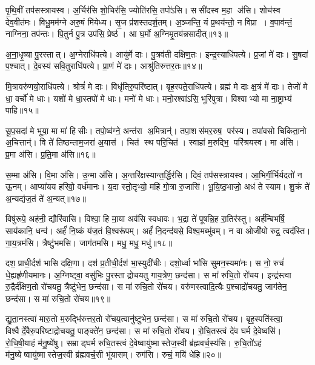 पृ॒थि॒वीं तप॑सस्त्रायस्व। अ॒र्चिर॑सि शो॒चिर॑सि॒ ज्योति॑रसि॒ तपो॑ऽसि। ससी॑दस्व म॒हा अ॑सि। शोच॑स्व देव॒वीत॑मः। विधू॒मम॑ग्ने अरु॒षं मि॑येध्य। सृ॒ज प्र॑शस्तदर्\mbox{}श॒तम्। अ॒ञ्जन्ति॒ यं प्र॒थय॑न्तो॒ न विप्रा। व॒पाव॑न्तं॒ नाग्निना॒ तप॑न्तः। पि॒तुर्न पु॒त्र उप॑सि॒ प्रेष्ठ॑। आ घ॒र्मो अ॒ग्निमृ॒तय॑न्नसादीत्॥१३॥

अ॒ना॒धृ॒ष्या पु॒रस्तात्। अ॒ग्नेराधि॑पत्ये। आयु॑र्मे दाः। पु॒त्रव॑ती दक्षिण॒तः। इन्द्र॒स्याधि॑पत्ये। प्र॒जां मे॑ दाः। सु॒षदा॑ प॒श्चात्। दे॒वस्य॑ सवि॒तुराधि॑पत्ये। प्रा॒णं मे॑ दाः। आश्रु॑तिरुत्तर॒तः॥१४॥

मि॒त्रावरु॑णयो॒राधि॑पत्ये। श्रोत्रं॑ मे दाः। विधृ॑तिरु॒परि॑ष्टात्। बृह॒स्पते॒राधि॑पत्ये। ब्रह्म॑ मे दाः क्ष॒त्रं मे॑ दाः। तेजो॑ मे धा॒ वर्चो॑ मे धाः। यशो॑ मे धा॒स्तपो॑ मे धाः। मनो॑ मे धाः। मनो॒रश्वा॑ऽसि॒ भूरि॑पुत्रा। विश्वाभ्यो मा ना॒ष्ट्राभ्य॑ पाहि॥१५॥

सू॒प॒सदा॑ मे भूया॒ मा मा॑ हिसीः। तपो॒ष्व॑ग्ने॒ अन्त॑रा अ॒मित्रान्॑। तपा॒शस॑मर॒रुष॒ पर॑स्य। तपा॑वसो चिकिता॒नो अ॒चित्तान्॑। वि ते॑ तिष्ठन्ताम॒जरा॑ अ॒यास॑। चित॑ स्थ परि॒चित॑। स्वाहा॑ म॒रुद्भि॒ परि॑श्रयस्व। मा अ॑सि। प्र॒मा अ॑सि। प्र॒ति॒मा अ॑सि॥१६॥

स॒म्मा अ॑सि। वि॒मा अ॑सि। उ॒न्मा अ॑सि। अ॒न्तरि॑क्षस्यान्त॒र्द्धि\-र॑सि। दिवं॒ तप॑सस्त्रायस्व। आ॒भिर्गी॒र्भिर्यदतो॑ न ऊ॒नम्। आप्या॑यय हरिवो॒ वर्ध॑मानः। य॒दा स्तो॒तृभ्यो॒ महि॑ गो॒त्रा रु॒जासि॑। भू॒यि॒ष्ठ॒भाजो॒ अध॑ ते स्याम। शु॒क्रं ते॑ अ॒न्यद्य॑ज॒तं ते॑ अ॒न्यत्॥१७॥

विषु॑रूपे॒ अह॑नी॒ द्यौरि॑वासि। विश्वा॒ हि मा॒या अव॑सि स्वधावः। भ॒द्रा ते॑ पूषन्नि॒ह रा॒तिर॑स्तु। अर्\mbox{}ह॑न्बिभर्\mbox{}षि॒ साय॑कानि॒ धन्व॑। अर्\mbox{}हं॑ नि॒ष्कं य॑ज॒तं  वि॒श्वरू॑पम्। अर्\mbox{}हं॑ नि॒दन्द॑यसे॒ विश्व॒मब्भु॑वम्। न वा ओजी॑यो रुद्र॒ त्वद॑स्ति। गा॒य॒त्रम॑सि। त्रैष्टु॑भमसि। जाग॑तमसि। मधु॒ मधु॒ मधु॑॥१८॥
\anuvakamend[अ॒न॒क्त्व॒सा॒दी॒दु॒त्त॒र॒तः पा॑हि प्रति॒मा अ॑सि यज॒तन्ते॑ अ॒न्यज्जाग॑तम॒स्येकं॑ च]

दश॒ प्राची॒र्दश॑ भासि दक्षि॒णा। दश॑ प्र॒तीची॒र्दश॑ भा॒स्युदी॑चीः। दशो॒र्ध्वा भा॑सि सुमन॒स्यमा॑नः। स नो॒ रुचं॑ धे॒ह्यहृ॑णीयमानः। अ॒ग्निष्ट्वा॒ वसु॑भिः पु॒रस्ताद्रोचयतु गाय॒त्रेण॒ छन्द॑सा। स मा॑ रुचि॒तो रो॑चय। इन्द्र॑स्त्वा रु॒द्रैर्द॑क्षिण॒तो रो॑चयतु॒ त्रैष्टु॑भेन॒ छन्द॑सा। स मा॑ रुचि॒तो रो॑चय। वरु॑णस्त्वादि॒त्यैः प॒श्चाद्रो॑चयतु॒ जाग॑तेन॒ छन्द॑सा। स मा॑ रुचि॒तो रो॑चय॥१९॥

द्यु॒ता॒नस्त्वा॑ मारु॒तो म॒रुद्भि॑रुत्तर॒तो रो॑चय॒त्वानु॑ष्टुभेन॒ छन्द॑सा। स मा॑ रुचि॒तो रो॑चय। बृह॒स्पति॑स्त्वा॒ विश्वैर्दे॒वैरु॒परि॑ष्टाद्रोचयतु॒ पाङ्क्ते॑न॒ छन्द॑सा। स मा॑ रुचि॒तो रो॑चय। रो॒चि॒तस्त्वं दे॑व घर्म दे॒वेष्वसि॑। रो॒चि॒षी॒याहं म॑नु॒ष्ये॑षु। सम्राड्घर्म रुचि॒तस्त्वं दे॒वेष्वायु॑ष्मास्तेज॒स्वी ब्र॑ह्मवर्च॒स्य॑सि। रु॒चि॒तो॑ऽहं म॑नु॒ष्येष्वायु॑ष्मास्तेज॒स्वी ब्र॑ह्मवर्च॒सी भू॑यासम्। रुग॑सि। रुचं॒ मयि॑ धेहि॥२०॥

